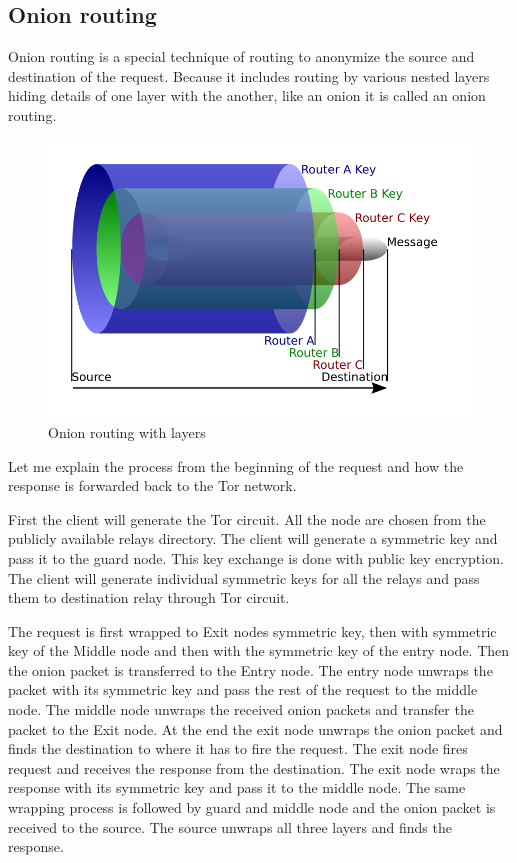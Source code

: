 \documentclass{article}
\begin{document}
    \subsection{Onion routing}
      Onion routing is a special technique of routing to anonymize the source
      and destination of the request. Because it includes routing by various
      nested layers hiding details of one layer with the another, like an onion
      it is called an onion routing.

      \begin{figure}[h!]
        \includegraphics[width=\linewidth]{onion_routing_with_layers.png}
        \caption{Onion routing with layers}
        \label{fig:onion_routing_with_layers}
      \end{figure}

      Let me explain the process from the beginning of the request and how the
      response is forwarded back to the Tor network.

      First the client will generate the Tor circuit. All the node are chosen
      from the publicly available relays directory. The client will generate a
      symmetric key and pass it to the guard node. This key exchange is done
      with public key encryption. The client will generate individual symmetric
      keys for all the relays and pass them to destination relay through Tor
      circuit.

      The request is first wrapped to Exit nodes symmetric key, then with
      symmetric key of the Middle node and then with the symmetric key of the
      entry node. Then the onion packet is transferred to the Entry node. The
      entry node unwraps the packet with its symmetric key and pass the rest of
      the request to the middle node. The middle node unwraps the received
      onion packets and transfer the packet to the Exit node. At the end the
      exit node unwraps the onion packet and finds the destination to where it
      has to fire the request. The exit node fires request and receives the
      response from the destination. The exit node wraps the response with its
      symmetric key and pass it to the middle node. The same wrapping process
      is followed by guard and middle node and the onion packet is received to
      the source. The source unwraps all three layers and finds the response.
\end{document}
